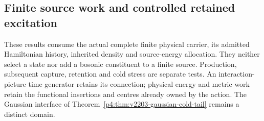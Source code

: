 \documentclass[12pt,a4paper]{article}
\begin{document}


\subsection{Finite source work and controlled retained excitation}
\label{p4:sec:v2209-finite-retained-source}
These results consume the actual complete finite physical carrier, its
admitted Hamiltonian history, inherited density and source-energy allocation.
They neither select a state nor add a bosonic constituent to a finite source.
Production, subsequent capture, retention and cold stress are separate tests.
An interaction-picture time generator retains its connection; physical energy
and metric work retain the functional insertions and centres already owned by
the action. The Gaussian interface of
Theorem~\ref{p4:thm:v2203-gaussian-cold-tail} remains a distinct domain.
\end{document}
